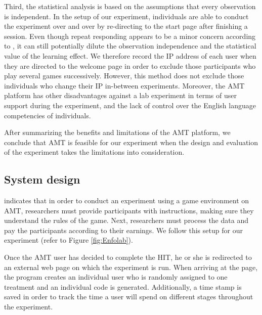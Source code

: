 Third, the statistical analysis is based on the assumptions that every observation is independent. In the setup of our experiment, individuals are able to conduct the experiment over and over by re-directing to the start page after finishing a session. Even though repeat responding appears to be a minor concern according to \cite{Berinsky2012}, it can still potentially dilute the observation independence and the statistical value of the learning effect. We therefore record the IP address of each user when they are directed to the welcome page in order to exclude those participants who play several games successively. However, this method does not exclude those individuals who change their IP in-between experiments.
Moreover, the \ac{AMT} platform has other disadvantages against a lab experiment in terms of user support during the experiment, and the lack of control over the English language competencies of individuals. 

After summarizing the benefits and limitations of the \ac{AMT} platform, we conclude that \ac{AMT} is feasible for our experiment when the design and evaluation of the experiment takes the limitations into consideration.

\subsection{System design}

\cite{Rand2012} indicates that in order to conduct an experiment using a game environment on \ac{AMT}, researchers must provide participants with instructions, making sure they understand the rules of the game. Next, researchers must process the data and pay the participants according to their earnings. We follow this setup for our experiment (refer to Figure \ref{fig:Enfolab}).

Once the \ac{AMT} user has decided to complete the \ac{HIT}, he or she is redirected to an external web page on which the experiment is run.
When arriving at the page, the program creates an individual user who is randomly assigned to one treatment and an individual code is generated. 
Additionally, a time stamp is saved in order to track the time a user will spend on different stages throughout the experiment.

